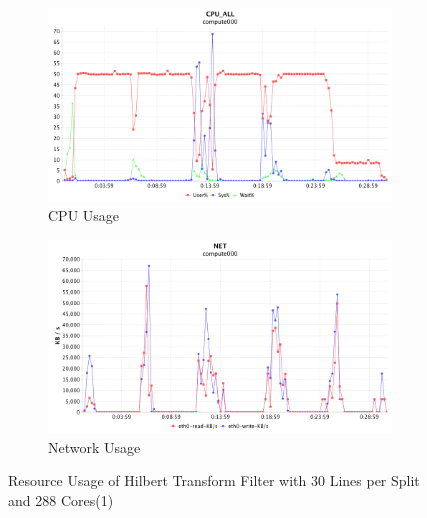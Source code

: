 \begin{figure}[h]
\centering
\begin{subfigure}{1\textwidth}
  \centering
  \includegraphics[width=1\linewidth]{figures/Htf30_288_CPU.png}
  \caption{CPU Usage}
  \label{Htf30_288_CPU}
\end{subfigure}
\begin{subfigure}{1\textwidth}
  \centering
  \includegraphics[width=1\linewidth]{figures/Htf30_288_NET.png}
  \caption{Network Usage}
  \label{Htf30_288_NET}
\end{subfigure}
\caption{Resource Usage of Hilbert Transform Filter with 30 Lines per Split and 288 Cores(1)}
\label{Htf30_288}
\end{figure}

